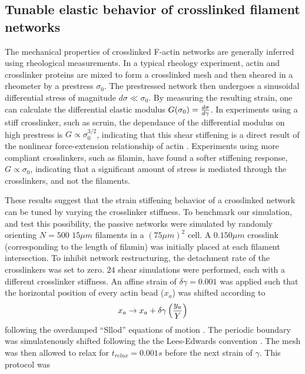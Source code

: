 \documentclass[12pt]{article}
\begin{document}
\subsection{Tunable elastic behavior of crosslinked filament networks}
\par
The mechanical properties of crosslinked F-actin networks are generally
inferred using rheological measurements\cite{gardel2004,koenderink2006,kasza2009,lin2010}.
In a typical rheology experiment, actin and crosslinker proteins are mixed to
form a crosslinked mesh and then sheared in a rheometer by a prestress
$\sigma_0$. The prestressed network then undergoes a sinusoidal
differential stress of magnitude $d\sigma\ll\sigma_0$. By measuring the resulting
strain, one can calculate the differential elastic modulus
$G(\sigma_0) = {d\sigma\over d\gamma}$. In experiments using a stiff
crosslinker, such as scruin, the dependance of the differential modulus on high
prestress is $G\propto\sigma_0^{3/2}$, indicating that this shear stiffening is
a direct result of the nonlinear force-extension relationship of actin 
\cite{gardel2004,lin2010}. Experiments using more compliant crosslinkers,
such as filamin, have found a softer stiffening response, $G\propto\sigma_0$,
indicating that a significant amount of stress is mediated through the
crosslinkers, and not the filaments\cite{kasza2009}.
\par 
These results suggest that the strain stiffening behavior of a crosslinked 
network can be tuned by varying the crosslinker
stiffness. To benchmark our simulation, and test this possibility, the 
passive networks were simulated by randomly orienting $N = 500$ $15\mu m$ 
filaments in a $(75\mu m)^2$ cell. A $0.150\mu m$ crosslink
(corresponding to the length of filamin) was initially placed at each filament
intersection.  
To inhibit network restructuring, the detachment rate of the crosslinkers was 
set to zero. $24$ shear simulations were performed, each with a different 
crosslinker stiffness. An affine strain of $\delta\gamma=0.001$ was applied such
that the horizontal position of every actin bead ($x_a$) was shifted according to  
\begin{equation}
  x_a \rightarrow x_a + \delta\gamma \left( {y_a\over Y} \right)
  \label{eqn:sllod}
\end{equation} 
following the overdamped ``Sllod'' equations of motion \cite{evans1984}. The 
periodic boundary was simulatenously shifted following the the Lees-Edwards 
convention \cite{allen}. The mesh was then allowed to relax for
$t_{relax} =0.001 s$ before the next strain of $\gamma$. This protocol was 
\end{document}
